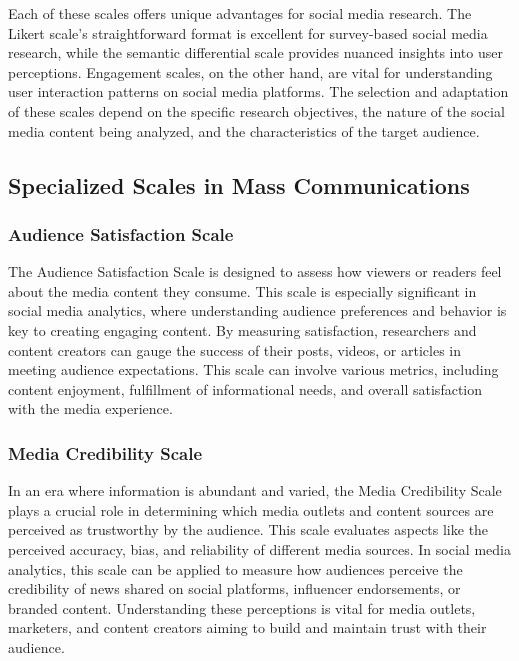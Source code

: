 \documentclass[
]{book}
\begin{document}
Each of these scales offers unique advantages for social media research. The Likert scale's straightforward format is excellent for survey-based social media research, while the semantic differential scale provides nuanced insights into user perceptions. Engagement scales, on the other hand, are vital for understanding user interaction patterns on social media platforms. The selection and adaptation of these scales depend on the specific research objectives, the nature of the social media content being analyzed, and the characteristics of the target audience.

\subsection*{Specialized Scales in Mass Communications}\label{specialized-scales-in-mass-communications}

\subsubsection*{Audience Satisfaction Scale}\label{audience-satisfaction-scale}

The Audience Satisfaction Scale is designed to assess how viewers or readers feel about the media content they consume. This scale is especially significant in social media analytics, where understanding audience preferences and behavior is key to creating engaging content. By measuring satisfaction, researchers and content creators can gauge the success of their posts, videos, or articles in meeting audience expectations. This scale can involve various metrics, including content enjoyment, fulfillment of informational needs, and overall satisfaction with the media experience.

\subsubsection*{Media Credibility Scale}\label{media-credibility-scale}

In an era where information is abundant and varied, the Media Credibility Scale plays a crucial role in determining which media outlets and content sources are perceived as trustworthy by the audience. This scale evaluates aspects like the perceived accuracy, bias, and reliability of different media sources. In social media analytics, this scale can be applied to measure how audiences perceive the credibility of news shared on social platforms, influencer endorsements, or branded content. Understanding these perceptions is vital for media outlets, marketers, and content creators aiming to build and maintain trust with their audience.
\end{document}
